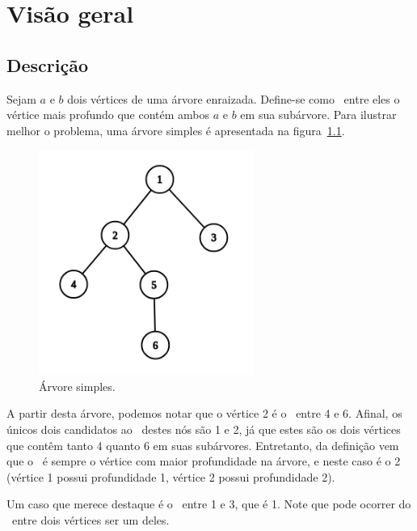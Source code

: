 \chapter{Visão geral}
\label{cap:visao-geral}

\section{Descrição}

Sejam $a$ e $b$ dois vértices de uma árvore enraizada. Define-se como \LCA\ entre eles o vértice mais profundo que contém ambos $a$ e $b$ em sua subárvore. Para ilustrar melhor o problema, uma árvore simples é apresentada na figura~\ref{fig:grafo-simples}.

\begin{figure}[htb]
\begin{center}
\includegraphics[width=7cm]{images/graph}
\end{center}
\caption{\label{fig:grafo-simples}Árvore simples.}
\end{figure}

A partir desta árvore, podemos notar que o vértice 2 é o \LCA\ entre 4 e 6. Afinal, os únicos dois candidatos ao \LCA\ destes nós são 1 e 2, já que estes são os dois vértices que contêm tanto 4 quanto 6 em suas subárvores. Entretanto, da definição vem que o \LCA\ é sempre o vértice com maior profundidade na árvore, e neste caso é o 2 (vértice 1 possui profundidade 1, vértice 2 possui profundidade 2).

Um caso que merece destaque é o \LCA\ entre 1 e 3, que é 1. Note que pode ocorrer do \LCA\ entre dois vértices ser um deles.

\vspace{50px}

